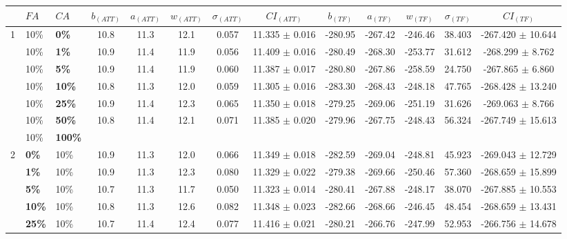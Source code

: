 \begin{sidewaystable}
    \hspace*{-0.5cm}
    \begin{tabular}{|l|l|l||c|c|c|c|c|c|c|c|c|c|}
    \hline
    ~ & $FA$ & $CA$ & $b_{(ATT)}$ & $a_{(ATT)}$ & $w_{(ATT)}$ & $\sigma_{(ATT)}$ & $CI_{(ATT)}$ & $b_{(TF)}$ & $a_{(TF)}$ & $w_{(TF)}$ & $\sigma_{(TF)}$ & $CI_{(TF)}$\\
    \hline
    1 & 10\% & \textbf{0\%} & 10.8 & 11.3 & 12.1 & 0.057 & 11.335 $\pm$ 0.016 & -280.95 & -267.42 & -246.46 & 38.403 & -267.420 $\pm$ 10.644\\
    ~ & 10\% & \textbf{1\%} & 10.9 & 11.4 & 11.9 & 0.056 & 11.409 $\pm$ 0.016 & -280.49 & -268.30 & -253.77 & 31.612 & -268.299 $\pm$ 8.762\\
    ~ & 10\% & \textbf{5\%} & 10.9 & 11.4 & 11.9 & 0.060 & 11.387 $\pm$ 0.017 & -280.80 & -267.86 & -258.59 & 24.750 & -267.865 $\pm$ 6.860\\
    ~ & 10\% & \textbf{10\%} & 10.8 & 11.3 & 12.0 & 0.059 & 11.305 $\pm$ 0.016 & -283.30 & -268.43 & -248.18 & 47.765 & -268.428 $\pm$ 13.240 \\
    ~ & 10\% & \textbf{25\%} & 10.9 & 11.4 & 12.3 & 0.065 & 11.350 $\pm$ 0.018 & -279.25 & -269.06 & -251.19 & 31.626 & -269.063 $\pm$ 8.766 \\
    ~ & 10\% & \textbf{50\%} & 10.8 & 11.4 & 12.1 & 0.071 & 11.385 $\pm$ 0.020 & -279.96 & -267.75 & -248.43 & 56.324 & -267.749 $\pm$ 15.613\\
    ~ & 10\% & \textbf{100\%} & ~ & ~ & ~ & ~ & ~ & ~ & ~ & ~ & ~ & ~ \\
    \hline
    2 & \textbf{0\%} & 10\% & 10.9 & 11.3 & 12.0 & 0.066 & 11.349 $\pm$ 0.018 & -282.59 & -269.04 & -248.81 & 45.923 & -269.043 $\pm$ 12.729 \\
    ~ & \textbf{1\%} & 10\% & 10.9 & 11.3 & 12.3 & 0.080 & 11.329 $\pm$ 0.022 & -279.38 & -269.66 & -250.46 & 57.360 & -268.659 $\pm$ 15.899 \\
    ~ & \textbf{5\%} & 10\% & 10.7 & 11.3 & 11.7 & 0.050 & 11.323 $\pm$ 0.014 & -280.41 & -267.88 & -248.17 & 38.070 & -267.885 $\pm$ 10.553 \\
    ~ & \textbf{10\%} & 10\% & 10.8 & 11.3 & 12.6 & 0.082 & 11.348 $\pm$ 0.023 & -282.66 & -268.66 & -246.45 & 48.454 & -268.659 $\pm$ 13.431 \\
    ~ & \textbf{25\%} & 10\% & 10.7 & 11.4 & 12.4 & 0.077 & 11.416 $\pm$ 0.021 & -280.21 & -266.76 & -247.99 & 52.953 & -266.756 $\pm$ 14.678 \\

\end{tabular}
\end{sidewaystable}
